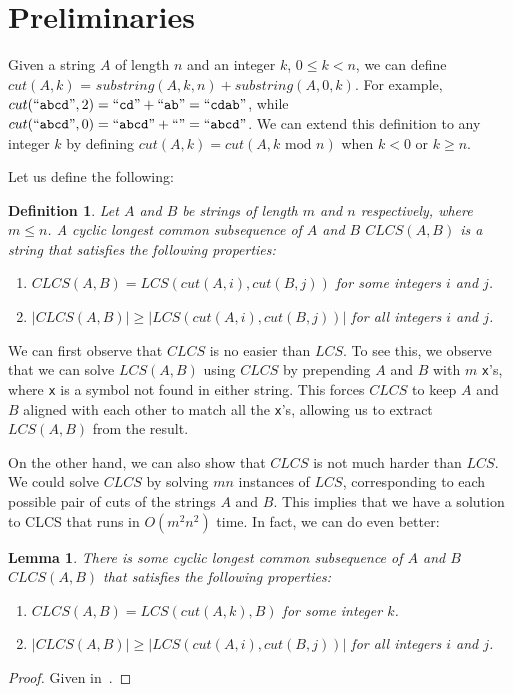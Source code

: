 \documentclass{article}
\newtheorem{definition}{Definition}
\newtheorem{lemma}{Lemma}
\begin{document}
\section{Preliminaries}

Given a string $A$ of length $n$ and an integer $k$, $0 \leq k < n$, we can define $cut(A, k)$ = $substring(A, k, n) + substring(A, 0, k)$.  For example, $cut(``\verb|abcd|", 2) = ``\verb|cd|" + ``\verb|ab|" = ``\verb|cdab|"$, while $cut(``\verb|abcd|", 0) = ``\verb|abcd|" + ``" = ``\verb|abcd|"$.  We can extend this definition to any integer $k$ by defining $cut(A, k) = cut(A, k\textrm{ mod } n)$ when $k < 0$ or $k \geq n$.

Let us define the following:

\begin{definition}
Let $A$ and $B$ be strings of length $m$ and $n$ respectively, where $m \leq n$.  A \emph{cyclic longest common subsequence} of $A$ and $B$ $CLCS(A,B)$ is a string that satisfies the following properties:
\begin{enumerate}
\item $CLCS(A,B) = LCS(cut(A,i),cut(B,j))$ for some integers $i$ and $j$.
\item $|CLCS(A,B)| \geq |LCS(cut(A,i),cut(B,j))|$ for all integers $i$ and $j$.
\end{enumerate}
\end{definition}

We can first observe that $CLCS$ is no easier than $LCS$.  To see this, we observe that we can solve $LCS(A,B)$ using $CLCS$ by prepending $A$ and $B$ with $m$ \verb|x|'s, where \verb|x| is a symbol not found in either string.  This forces $CLCS$ to keep $A$ and $B$ aligned with each other to match all the \verb|x|'s, allowing us to extract $LCS(A,B)$ from the result.

On the other hand, we can also show that $CLCS$ is not much harder than $LCS$.  We could solve $CLCS$ by solving $mn$ instances of $LCS$, corresponding to each possible pair of cuts of the strings $A$ and $B$.  This implies that we have a solution to CLCS that runs in $O(m^2 n^2)$ time.  In fact, we can do even better:

\begin{lemma}
There is some cyclic longest common subsequence of $A$ and $B$ $CLCS(A,B)$ that satisfies the following properties:
\begin{enumerate}
\item $CLCS(A,B) = LCS(cut(A,k),B)$ for some integer $k$.
\item $|CLCS(A,B)| \geq |LCS(cut(A,i),cut(B,j))|$ for all integers $i$ and $j$.
\end{enumerate}
\end{lemma}
\begin{proof}
Given in~\cite{M90}.
\end{proof}
\end{document}
